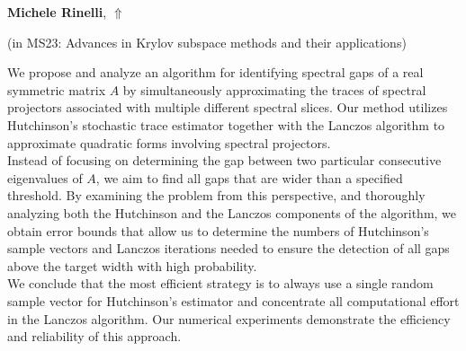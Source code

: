 \documentclass[ILAS2025-program.tex]{subfiles}
\begin{document}
\hypertarget{down0193}{}\begin{ilasabstract}
    
\textbf{Michele Rinelli},  \hfill \hyperlink{up0193}{$\Uparrow$}
    
    
(in {\color{mstitle}MS23: Advances in Krylov subspace methods and their applications})
        
\mtskip
    We propose and analyze an algorithm for identifying spectral gaps of a real symmetric matrix $A$ by simultaneously approximating the traces of spectral projectors associated with multiple different spectral slices. Our method utilizes Hutchinson's stochastic trace estimator together with the Lanczos algorithm to approximate quadratic forms involving spectral projectors.\\
Instead of focusing on determining the gap between two particular consecutive eigenvalues of $A$, we aim to find all gaps that are wider than a specified threshold. By examining the problem from this perspective, and thoroughly analyzing both the Hutchinson and the Lanczos components of the algorithm, we obtain error bounds that allow us to determine the numbers of Hutchinson's sample vectors and Lanczos iterations needed to ensure the detection of all gaps above the target width with high probability.\\
We conclude that the most efficient strategy is to always use a single random sample vector for Hutchinson's estimator and concentrate all computational effort in the Lanczos algorithm. Our numerical experiments demonstrate the efficiency and reliability of this approach.

\end{ilasabstract}
    
\end{document}
